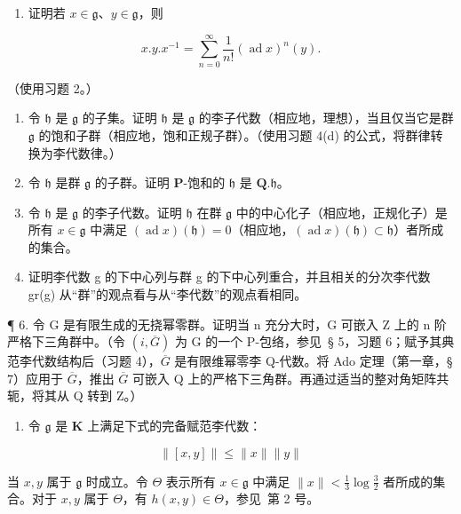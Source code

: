 \begin{enumerate}
\def\labelenumi{(\alph{enumi})}
\tightlist
\item
  证明若 \(x \in \mathfrak{g}\)、\(y \in \mathfrak{g}\)，则
\end{enumerate}

\[
x. y. x ^ {- 1} = \sum_ {n = 0} ^ {\infty} \frac {1}{n !} (\operatorname{ad} x) ^ {n} (y).
\]

（使用习题 2。）

\begin{enumerate}
\def\labelenumi{(\alph{enumi})}
\setcounter{enumi}{1}
\item
  令 \(\mathfrak{h}\) 是 \(\mathfrak{g}\) 的子集。证明 \(\mathfrak{h}\) 是 \(\mathfrak{g}\) 的李子代数（相应地，理想），当且仅当它是群 \(\mathfrak{g}\) 的饱和子群（相应地，饱和正规子群）。（使用习题 4(d) 的公式，将群律转换为李代数律。）
\item
  令 \(\mathfrak{h}\) 是群 \(\mathfrak{g}\) 的子群。证明 \(\mathbf{P}\)-饱和的 \(\mathfrak{h}\) 是 \(\mathbf{Q}.\mathfrak{h}\)。
\item
  令 \(\mathfrak{h}\) 是 \(\mathfrak{g}\) 的李子代数。证明 \(\mathfrak{h}\) 在群 \(\mathfrak{g}\) 中的中心化子（相应地，正规化子）是所有 \(x \in \mathfrak{g}\) 中满足 \((\operatorname{ad} x)(\mathfrak{h}) = 0\)（相应地，\((\operatorname{ad} x)(\mathfrak{h}) \subset \mathfrak{h}\)）者所成的集合。
\item
  证明李代数 g 的下中心列与群 g 的下中心列重合，并且相关的分次李代数 gr(g) 从“群”的观点看与从“李代数”的观点看相同。
\end{enumerate}

¶ 6. 令 G 是有限生成的无挠幂零群。证明当 n 充分大时，G 可嵌入 Z 上的 n 阶严格下三角群中。（令 \((i, \overline{G})\) 为 G 的一个 P-包络，参见~§ 5，习题 6；赋予其典范李代数结构后（习题 4），\(\overline{G}\) 是有限维幂零李 Q-代数。将 Ado 定理（第一章，§ 7）应用于 \(\overline{G}\)，推出 \(\overline{G}\) 可嵌入 Q 上的严格下三角群。再通过适当的整对角矩阵共轭，将其从 Q 转到 Z。）


\begin{enumerate}
\def\labelenumi{\arabic{enumi}.}
\tightlist
\item
  令 \(\mathfrak{g}\) 是 \(\mathbf{K}\) 上满足下式的完备赋范李代数：
\end{enumerate}

\[
\| [ x, y ] \| \leqslant \| x \| \| y \|
\]

当 \(x, y\) 属于 \(\mathfrak{g}\) 时成立。令 \(\Theta\) 表示所有 \(x \in \mathfrak{g}\) 中满足 \(\| x \| < \frac{1}{3} \log \frac{3}{2}\) 者所成的集合。对于 \(x, y\) 属于 \(\Theta\)，有 \(h(x, y) \in \Theta\)，参见~第 2 号。

